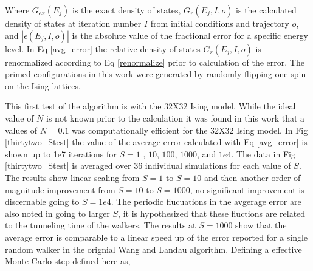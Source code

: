 \documentclass[aps,prl,reprint,superscriptaddress,showkeys]{revtex4-1}
\begin{document}
Where $G_{ex}(E_j)$ is the exact density of states, $G_{r}(E_j,I,o)$ is the calculated density of states  at iteration number $I$ from initial conditions and trajectory $o$, and $|\epsilon(E_j,I,o)|$ is the absolute value of the fractional error for a specific energy level. In Eq \ref{avg_error} the relative density of states $G_{r}(E_j,I,o)$ is renormalized according to Eq \ref{renormalize} prior to calculation of the error.  The primed configurations in this work were generated by randomly flipping one spin on the Ising lattices. 

This first test of the algorithm is with the 32X32 Ising model. While the ideal value of $N$ is not known prior to the calculation it was found in this work that a values of $N=0.1$ was computationally efficient for the 32X32 Ising model. In Fig \ref{thirtytwo_Stest} the value of the average error calculated with Eq \ref{avg_error} is shown up to 1e7 iterations for $S=1$ , $10$, $100$, $1000$, and $1e4$. The data in Fig \ref{thirtytwo_Stest} is averaged over 36 individual simulations for each value of $S$. The results show linear scaling from $S=1$ to $S=10$ and then another order of magnitude improvement from $S=10$ to $S=1000$, no significant improvement is discernable going to $S=1e4$.  The periodic flucuations in the avgerage error are also noted in going to larger $S$, it is hypothesized that these fluctions are related to the tunneling time of the walkers. The results at $S=1000$ show that the average error is comparable to a linear speed up of the error reported for a single random walker in the orignial Wang and Landau algorithm. Defining a effective Monte Carlo step defined here as,
\end{document}

